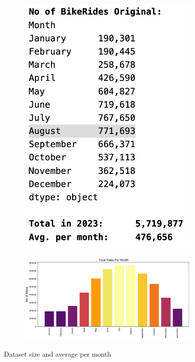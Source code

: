 \documentclass[12pt]{article}
\begin{document}
	\begin{figure}[h]
	\centering
	\begin{subfigure}{.3\textwidth}
	\hspace{-0.4 in}
		\includegraphics[scale=0.5]{no_of_rides_orig.png}
	\end{subfigure}
	\begin{subfigure}{.6\textwidth}
	\hspace{-0.8 in}
		\includegraphics[scale=0.47]{no_of_rides_per_month.pdf}
	\end{subfigure}
	\caption{Dataset size and average per month}
	\label{fig3}
	\end{figure}
\end{document}
